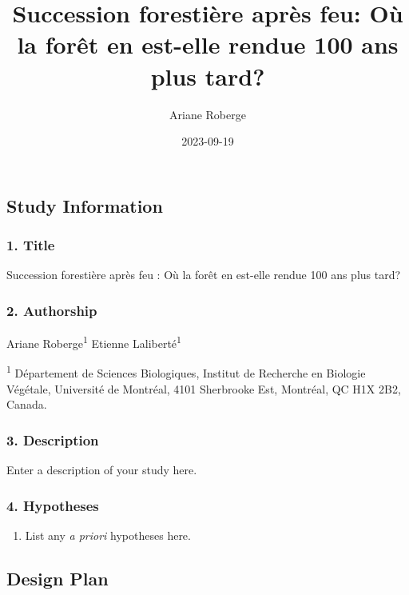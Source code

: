 \documentclass[
]{article}
\title{Succession forestière après feu: Où la forêt en est-elle rendue
100 ans plus tard?}
\author{Ariane Roberge}
\date{2023-09-19}
\providecommand{\tightlist}{%
  \setlength{\itemsep}{0pt}\setlength{\parskip}{0pt}}
\begin{document}
\maketitle

\hypertarget{study-information}{%
\subsection{Study Information}\label{study-information}}

\hypertarget{title}{%
\subsubsection{1. Title}\label{title}}

Succession forestière après feu : Où la forêt en est-elle rendue 100 ans
plus tard?

\hypertarget{authorship}{%
\subsubsection{2. Authorship}\label{authorship}}

Ariane Roberge\textsuperscript{1} Etienne Laliberté\textsuperscript{1}

\textsuperscript{1} Département de Sciences Biologiques, Institut de
Recherche en Biologie Végétale, Université de Montréal, 4101 Sherbrooke
Est, Montréal, QC H1X 2B2, Canada.

\hypertarget{description}{%
\subsubsection{3. Description}\label{description}}

Enter a description of your study here.

\hypertarget{hypotheses}{%
\subsubsection{4. Hypotheses}\label{hypotheses}}

\begin{enumerate}
\def\labelenumi{\arabic{enumi}.}
\tightlist
\item
  List any \emph{a priori} hypotheses here.
\end{enumerate}

\hypertarget{design-plan}{%
\subsection{Design Plan}\label{design-plan}}
\end{document}
